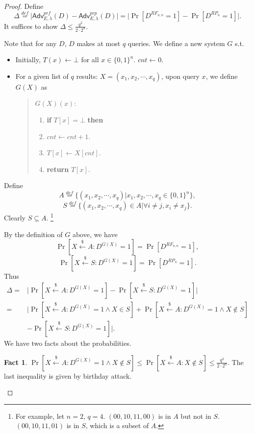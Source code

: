 \documentclass[12pt]{article}
\newcommand{\eqdef}{\stackrel{def}{=}}
\newcommand{\bits}{\{0,1\}}
\newcommand{\getsr}{\stackrel{\$}{\gets}}
\newcommand{\Adv}{\mathsf{Adv}}
\newcommand{\tab}{\hspace{0.3in}}
\theoremstyle{definition}
\newtheorem{fact}[theorem]{Fact}
\begin{document}
\begin{proof}
Define
$$
\Delta \eqdef \bigg| \Adv_{E,\lambda}^{prf}(D) - \Adv_{E,\lambda}^{prp}(D) \bigg| 
= \bigg| \Pr[D^{RF_{n,n}}=1] - \Pr[D^{RP_n}=1] \bigg|.
$$
It suffices to show $\Delta \leq \frac{q^2}{2 \cdot 2^n}$. 

Note that for any $D$, $D$ makes at most $q$ queries. We define a new system $G$ s.t.
\begin{itemize}
\item Initially, $T(x) \gets \bot$ for all $x \in \bits^n$. $cnt \gets 0$.
\item For a given list of $q$ results: $X = (x_1, x_2, \cdots, x_q)$, upon query $x$, we define $G(X)$ as
\begin{quote}
$G(X)(x)$:
\begin{enumerate}
\item {\bf if} $T[x] = \bot$ {\bf then}
\item \tab $cnt \gets cnt + 1$.
\item \tab $T[x] \gets X[cnt]$.
\item {\bf return} $T[x]$.
\end{enumerate}
\end{quote}
\end{itemize}

Define
$$A \eqdef \{(x_1,x_2,\cdots,x_q) | x_1,x_2,\cdots,x_q \in \bits^n \},$$
$$S \eqdef \{(x_1,x_2,\cdots,x_q) \in A | \forall i \not= j, x_i \not= x_j \}. $$
Clearly $S\subseteq A$. \footnote{For example, let $n=2$, $q=4$. $(00, 10, 11, 00)$ is in $A$ but not in $S$. $(00, 10, 11, 01)$ is in $S$, which is a subset of $A$.}

By the definition of $G$ above, we have
$$\Pr[X \getsr A : D^{G(X)}=1] = \Pr[D^{RF_{n,n}}=1],$$
$$\Pr[X \getsr S : D^{G(X)}=1] = \Pr[D^{RP_n}=1].$$
Thus
$$\begin{aligned}
\Delta = & \bigg| \Pr[X \getsr A : D^{G(X)}=1] - \Pr[X \getsr S : D^{G(X)}=1] \bigg| \\
=& \bigg| \Pr[X \getsr A : D^{G(X)}=1 \wedge X \in S] + \Pr[X \getsr A : D^{G(X)}=1 \wedge X \not\in S] \\
& - \Pr[X \getsr S : D^{G(X)}=1] \bigg|.
\end{aligned}$$
We have two facts about the probabilities.
\begin{fact}
$\Pr [X \getsr A : D^{G(X)}=1 \wedge X \not\in S] \leq \Pr [X \getsr A : X \not\in S] \leq \frac{q^2}{2 \cdot 2^n}$. The last inequality is given by birthday attack.
\end{fact}


\end{proof}
\end{document}
